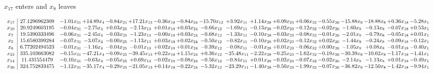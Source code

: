 \documentclass[9pt]{article}
\begin{document}
 $ x_{17} $ enters and $ x_{8} $ leaves 

 \[\begin{array}{c| c c@{\hskip 2pt} c@{\hskip 2pt} c@{\hskip 2pt} c@{\hskip 2pt} c@{\hskip 2pt} c@{\hskip 2pt} c@{\hskip 2pt} c@{\hskip 2pt} c@{\hskip 2pt} c@{\hskip 2pt} c@{\hskip 2pt} c@{\hskip 2pt} c@{\hskip 2pt} c@{\hskip 2pt} c@{\hskip 2pt} c@{\hskip 2pt} }
 x_{17}   &  27.1296962309 & -1.01 x_{31} & + 14.89 x_{4} & -0.84 x_{25} & + 17.21 x_{13} & -0.36 x_{19} & -0.84 x_{24} & -15.70 x_{12} & +  3.92 x_{11} & +  1.14 x_{28} & +  0.09 x_{23} & +  0.06 x_{32} & -0.55 x_{26} & -15.88 x_{9} & -18.88 x_{8} & +  0.36 x_{18} & -5.28 x_{1}\\
 x_{10}   &  20.9249603195 & -0.04 x_{31} & -2.75 x_{4} & +  0.03 x_{25} & -2.13 x_{13} & +  0.01 x_{19} & +  0.03 x_{24} & -0.66 x_{12} & -1.69 x_{11} & -0.13 x_{28} & -0.02 x_{23} & -0.12 x_{32} & -0.02 x_{26} & -1.60 x_{9} & -0.13 x_{8} & -0.07 x_{18} & +  0.53 x_{1}\\
 x_{7}   &  19.5390333496 & -0.06 x_{31} & -2.45 x_{4} & -0.03 x_{25} & -1.23 x_{13} & -0.00 x_{19} & +  0.03 x_{24} & -0.68 x_{12} & -1.33 x_{11} & -0.10 x_{28} & -0.03 x_{23} & -0.08 x_{32} & -0.01 x_{26} & -2.01 x_{9} & -0.79 x_{8} & -0.05 x_{18} & +  0.01 x_{1}\\
 x_{5}   &  15.6580399284 & -0.07 x_{31} & -3.07 x_{4} & -0.00 x_{25} & -1.13 x_{13} & +  0.03 x_{19} & +  0.02 x_{24} & -0.50 x_{12} & -0.82 x_{11} & -0.10 x_{28} & +  0.02 x_{23} & -0.12 x_{32} & +  0.02 x_{26} & -1.44 x_{9} & -0.24 x_{8} & -0.09 x_{18} & -0.12 x_{1}\\
 x_{6}   &  6.77202494523 & -0.01 x_{31} & -1.16 x_{4} & -0.04 x_{25} & -0.01 x_{13} & +  0.02 x_{19} & +  0.01 x_{24} & -0.39 x_{12} & -0.08 x_{11} & -0.01 x_{28} & +  0.01 x_{23} & -0.06 x_{32} & +  0.00 x_{26} & -1.05 x_{9} & +  0.08 x_{8} & -0.01 x_{18} & -0.40 x_{1}\\
 x_{22}   &  335.103663082 & -0.15 x_{31} & -47.21 x_{4} & -0.09 x_{25} & -39.45 x_{13} & +  0.22 x_{19} & +  1.15 x_{24} & +  0.36 x_{12} & -25.48 x_{11} & -2.22 x_{28} & -0.25 x_{23} & -1.62 x_{32} & -0.19 x_{26} & -30.39 x_{9} & -10.62 x_{8} & -1.17 x_{18} & -1.41 x_{1}\\
 x_{14}   &  11.431554479 & -0.10 x_{31} & -0.63 x_{4} & -0.05 x_{25} & +  0.69 x_{13} & -0.02 x_{19} & -0.08 x_{24} & -0.56 x_{12} & -0.84 x_{11} & +  0.01 x_{28} & -0.02 x_{23} & -0.07 x_{32} & -0.02 x_{26} & -2.14 x_{9} & -1.13 x_{8} & +  0.01 x_{18} & -0.49 x_{1}\\
 x_{30}   &  324.752833475 & -1.12 x_{31} & -35.17 x_{4} & -0.29 x_{25} & -21.05 x_{13} & +  0.14 x_{19} & -0.22 x_{24} & -5.32 x_{12} & -23.29 x_{11} & -1.40 x_{28} & -0.50 x_{23} & -1.99 x_{32} & -0.07 x_{26} & -36.82 x_{9} & -12.50 x_{8} & -1.42 x_{18} & -9.94 x_{1}\\

\end{array}\]
\end{document}
